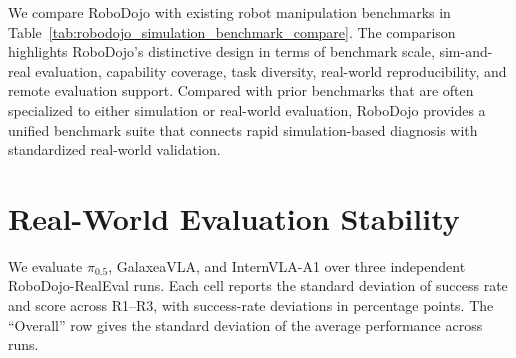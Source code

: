 We compare RoboDojo with existing robot manipulation benchmarks in Table~\ref{tab:robodojo_simulation_benchmark_compare}. The comparison highlights RoboDojo's distinctive design in terms of benchmark scale, sim-and-real evaluation, capability coverage, task diversity, real-world reproducibility, and remote evaluation support. Compared with prior benchmarks that are often specialized to either simulation or real-world evaluation, RoboDojo provides a unified benchmark suite that connects rapid simulation-based diagnosis with standardized real-world validation.



\section{Real-World Evaluation Stability}

We evaluate $\pi_{0.5}$, GalaxeaVLA, and InternVLA-A1 over three independent RoboDojo-RealEval runs. Each cell reports the standard deviation of success rate and score across R1--R3, with success-rate deviations in percentage points. The ``Overall'' row gives the standard deviation of the average performance across runs.

